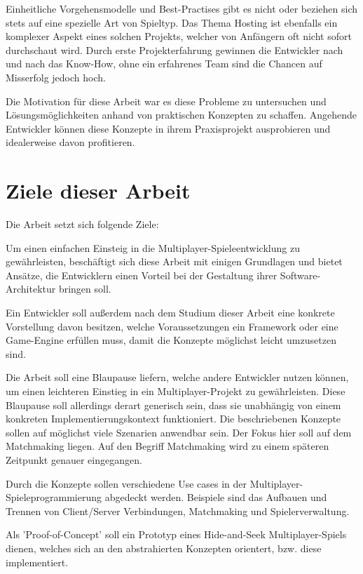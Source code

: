 Einheitliche Vorgehensmodelle und Best-Practises gibt es nicht oder beziehen sich stets auf eine spezielle Art von Spieltyp. Das Thema Hosting ist ebenfalls ein komplexer Aspekt eines solchen Projekts, welcher von Anfängern oft nicht sofort durchschaut wird. Durch erste Projekterfahrung gewinnen die Entwickler nach und nach das Know-How, ohne ein erfahrenes Team sind die Chancen auf Misserfolg jedoch hoch. \cite{Payne.18.09.2019}

Die Motivation für diese Arbeit war es diese Probleme zu untersuchen und Lösungsmöglichkeiten anhand von praktischen Konzepten zu schaffen. Angehende Entwickler können diese Konzepte in ihrem Praxisprojekt ausprobieren und idealerweise davon profitieren.

\section{Ziele dieser Arbeit}
Die Arbeit setzt sich folgende Ziele:

Um einen einfachen Einsteig in die Multiplayer-Spieleentwicklung zu gewährleisten, beschäftigt sich diese Arbeit mit einigen Grundlagen und bietet Ansätze, die Entwicklern einen Vorteil bei der Gestaltung ihrer Software-Architektur bringen soll.

Ein Entwickler soll außerdem nach dem Studium dieser Arbeit eine konkrete Vorstellung davon besitzen, welche Voraussetzungen ein Framework oder eine Game-Engine erfüllen muss, damit die Konzepte möglichst leicht umzusetzen sind.

Die Arbeit soll eine Blaupause liefern, welche andere Entwickler nutzen können, um einen leichteren Einstieg in ein Multiplayer-Projekt zu gewährleisten. Diese Blaupause soll allerdings derart generisch sein, dass sie unabhängig von einem konkreten Implementierungskontext funktioniert. Die beschriebenen Konzepte sollen auf möglichst viele Szenarien anwendbar sein. Der Fokus hier soll auf dem Matchmaking liegen. Auf den Begriff Matchmaking wird zu einem späteren Zeitpunkt genauer eingegangen.

Durch die Konzepte sollen verschiedene Use cases in der Multiplayer-Spieleprogrammierung abgedeckt werden. Beispiele sind das Aufbauen und Trennen von Client/Server Verbindungen, Matchmaking und Spielerverwaltung.

Als 'Proof-of-Concept' soll ein Prototyp eines Hide-and-Seek Multiplayer-Spiels dienen, welches sich an den abstrahierten Konzepten orientert, bzw. diese implementiert.

